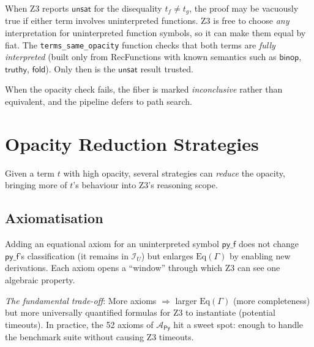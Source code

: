 \begin{remark}
\label{rem:opacity-check}
When Z3 reports $\mathsf{unsat}$ for the disequality
$t_f \neq t_g$, the proof may be vacuously true if either term
involves uninterpreted functions.  Z3 is free to choose \emph{any}
interpretation for uninterpreted function symbols, so it can
make them equal by fiat.  The \texttt{terms\_same\_opacity}
function checks that both terms are \emph{fully interpreted}
(built only from RecFunctions with known semantics such as
$\mathsf{binop}$, $\mathsf{truthy}$, $\mathsf{fold}$).
Only then is the $\mathsf{unsat}$ result trusted.

When the opacity check fails, the fiber is marked
\emph{inconclusive} rather than equivalent, and the pipeline
defers to path search.
\end{remark}


\section{Opacity Reduction Strategies}
\label{sec:opacity-reduction}

Given a term $t$ with high opacity, several strategies can
\emph{reduce} the opacity, bringing more of $t$'s behaviour into
Z3's reasoning scope.

\subsection{Axiomatisation}

\begin{definition}
\label{def:axiom-reduction}
Adding an equational axiom for an uninterpreted symbol $\mathsf{py\_f}$
does not change $\mathsf{py\_f}$'s classification (it remains in
$\mathcal{I}_U$) but enlarges $\mathrm{Eq}(\Gamma)$ by enabling
new derivations.  Each axiom opens a ``window'' through which Z3
can see one algebraic property.

\emph{The fundamental trade-off}:  More axioms $\Longrightarrow$
larger $\mathrm{Eq}(\Gamma)$ (more completeness) but more
universally quantified formulas for Z3 to instantiate
(potential timeouts).  In practice, the 52 axioms of
$\mathcal{A}_{\mathsf{Py}}$ hit a sweet spot: enough to handle
the benchmark suite without causing Z3 timeouts.
\end{definition}

